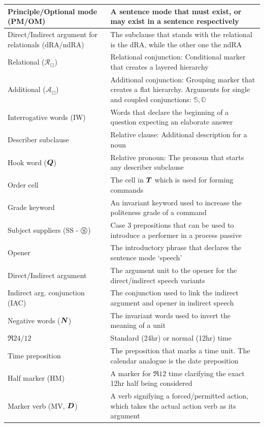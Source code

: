 \begin{center}
\begin{tabular}{m{5cm} m{10cm}}
    Principle/Optional mode (PM/OM) & A sentence mode that must exist, or may exist in a sentence respectively\\\hline
    Direct/Indirect argument for  relationals (dRA/ndRA) & The subclause that stands with the relational is the dRA, while the other one the ndRA\\\hline
    Relational ($\mathcal{R}_\boxdot$) & Relational conjunction:   Conditional marker that creates a layered hierarchy\\\hline
    Additional ($\mathcal{A}_\boxdot$) & Additional conjunction: Grouping marker that creates a flat hierarchy. Arguments for single and coupled conjunctions: $\mathbb{S}, \mathbb{O}$\\\hline
    Interrogative words (IW)& Words that declare the beginning of a question expecting an elaborate answer\\\hline
    Describer subclause & Relative clause: Additional description for a noun \\\hline
    Hook word ($\boldsymbol{Q}$) & Relative pronoun: The pronoun that starts any describer subclause\\\hline
    Order cell & The cell in $\boldsymbol{T}$ which is used for forming commands\\\hline
    Grade keyword & An invariant keyword used to increase the politeness grade of a command\\\hline
    Subject suppliers (SS - $\circledS$) & Case $3$ prepositions that can be used to introduce a performer in a process passive\\\hline
    Opener & The introductory phrase that declares the sentence mode `speech'\\\hline
    Direct/Indirect argument & The argument unit to the opener for the direct/indirect speech variants\\\hline
    Indirect arg. conjunction (IAC) & The conjunction used to link the indirect argument and opener in  indirect speech\\\hline
    Negative words ($\boldsymbol{N}$) & The invariant words used to invert the meaning of a unit\\\hline
    $\mathfrak{R}24/12$ & Standard (24hr) or normal (12hr) time\\\hline
    Time preposition & The preposition that  marks a time unit. The calendar analogue is the date preposition\\\hline
    Half marker (HM) & A marker for $\mathfrak{R}12$ time clarifying the exact 12hr half being considered\\\hline
    Marker verb (MV, $\boldsymbol{D}$) & A verb  signifying a forced/permitted action, which takes the actual action verb as its argument\\\hline
\end{tabular}
\end{center}

